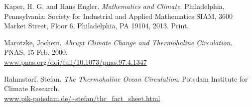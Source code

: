 \documentclass[10pt, letterpaper, answer]{exam}
\begin{document}
\begin{thebibliography}{9}
Kaper, H. G, and Hans Engler. \emph{Mathematics and Climate}. Philadelphia, Pennsylvania: Society for Industrial and Applied Mathematics SIAM, 3600 Market Street, Floor 6, Philadelphia, PA 19104, 2013. Print.

Marotzke, Jochem. \emph{Abrupt Climate Change and Thermohaline Circulation}. PNAS, 15 Feb. 2000. \\
\url{www.pnas.org/doi/full/10.1073/pnas.97.4.1347} 

Rahmstorf, Stefan. \emph{The Thermohaline Ocean Circulation}. Potsdam Institute for Climate Research. \\
\url{www.pik-potsdam.de/~stefan/thc_fact_sheet.html}

\end{thebibliography}
\end{document}
